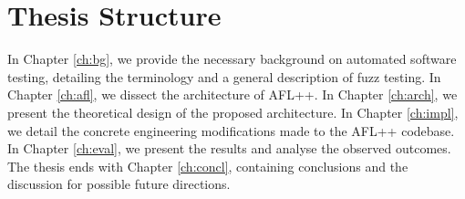 \section{Thesis Structure}

In Chapter \ref{ch:bg}, we provide the necessary background on automated software testing, detailing the terminology and a general description of fuzz testing. In Chapter \ref{ch:afl}, we dissect the architecture of AFL++. In Chapter \ref{ch:arch}, we present the theoretical design of the proposed architecture. In Chapter \ref{ch:impl}, we detail the concrete engineering modifications made to the AFL++ codebase. In Chapter \ref{ch:eval}, we present the results and analyse the observed outcomes. The thesis ends with Chapter \ref{ch:concl}, containing conclusions and the discussion for possible future directions.